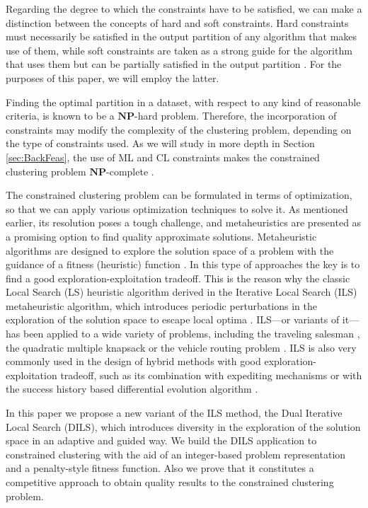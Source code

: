 \documentclass[review]{elsarticle}
\begin{document}
Regarding the degree to which the constraints have to be satisfied, we can make a distinction between the concepts of hard \cite{wagstaff2001constrained} and soft \cite{law2004clustering} constraints. Hard constraints must necessarily be satisfied in the output partition of any algorithm that makes use of them, while soft constraints are taken as a strong guide for the algorithm that uses them but can be partially satisfied in the output partition \cite{seret2014new}. For the purposes of this paper, we will employ the latter.

Finding the optimal partition in a dataset, with respect to any kind of reasonable criteria, is known to be a $\mathbf{NP}$-hard problem. Therefore, the incorporation of constraints may modify the complexity of the clustering problem, depending on the type of constraints used. As we will study in more depth in Section \ref{sec:BackFeas}, the use of ML and CL constraints makes the constrained clustering problem $\mathbf{NP}$-complete \cite{davidson2005clustering}.

The constrained clustering problem can be formulated in terms of optimization, so that we can apply various optimization techniques to solve it. As mentioned earlier, its resolution poses a tough challenge, and metaheuristics are presented as a promising option to find quality approximate solutions. Metaheuristic algorithms are designed to explore the solution space of a problem with the guidance of a fitness (heuristic) function \cite{Gendreau:2010:HM:1941310}. In this type of approaches the key is to find a good exploration-exploitation tradeoff. This is the reason why the classic Local Search (LS) heuristic algorithm derived in the Iterative Local Search (ILS) metaheuristic algorithm, which introduces periodic perturbations in the exploration of the solution space to escape local optima \cite{lourencco2010iterated}. ILS---or variants of it---has been applied to a wide variety of problems, including the traveling salesman \cite{archetti2018iterated}, the quadratic multiple knapsack \cite{avci2017multi} or the vehicle routing problem \cite{chentli2018impact, estrada2019biased}. ILS is also very commonly used in the design of hybrid methods with good exploration-exploitation tradeoff, such as its combination with expediting mechanisms \cite{zohali2019reformulation} or with the success history based differential evolution algorithm \cite{zhao2019hybrid}.

In this paper we propose a new variant of the ILS method, the Dual Iterative Local Search (DILS), which introduces diversity in the exploration of the solution space in an adaptive and guided way. We build the DILS application to constrained clustering with the aid of an integer-based problem representation and a penalty-style fitness function. Also we prove that it constitutes a competitive approach to obtain quality results to the constrained clustering problem.
\end{document}
